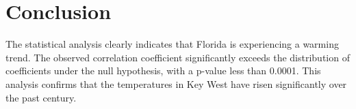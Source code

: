 \documentclass[10pt]{article}
\begin{document}
\section{Conclusion}
The statistical analysis clearly indicates that Florida is experiencing a warming trend. The observed correlation coefficient significantly exceeds the distribution of coefficients under the null hypothesis, with a p-value less than 0.0001. This analysis confirms that the temperatures in Key West have risen significantly over the past century.
\end{document}
